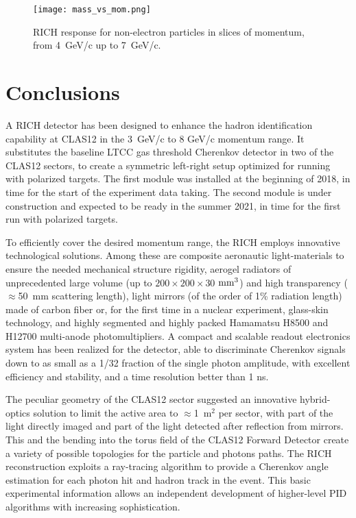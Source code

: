 \documentclass[5p,times,twocolumn]{elsarticle}
\begin{document}
\begin{figure}[t]
\begin{center}
\texttt{[image: mass\_vs\_mom.png]}
\end{center}
\caption{RICH response for non-electron particles in slices of momentum, from 4~GeV/c up to 7~GeV/c.}
\label{Fig:CHhad2}
\end{figure}

\section{Conclusions}

A RICH detector has been designed to enhance the hadron identification capability 
at CLAS12 in the 3~GeV/c to 8 GeV/c momentum range. It substitutes the baseline LTCC gas threshold Cherenkov detector 
in two of the CLAS12 sectors, to create a symmetric left-right setup 
optimized for running with polarized targets. The first module was
installed at the beginning of 2018, in time for the start of the experiment data 
taking. The second module is under construction and expected to be ready in 
the summer 2021, in time for the first run with polarized targets.

To efficiently cover the desired momentum range, the RICH employs 
innovative technological solutions. Among these are composite 
aeronautic light-materials to ensure the needed mechanical structure rigidity, 
aerogel radiators of unprecedented large volume (up to $200 \times 200 \times 30$ $\rm mm^3$) 
and high transparency ($\approx$50~mm scattering length), light mirrors
(of the order of 1\% radiation length) made of carbon fiber or, for
the first time in a nuclear experiment, glass-skin technology, and
highly segmented and highly packed Hamamatsu H8500 and H12700 multi-anode photomultipliers.
A compact and scalable readout electronics system has been realized for 
the detector, able to discriminate Cherenkov signals down to as small as a 1/32 fraction
of the single photon amplitude, with excellent efficiency and stability,
and a time resolution better than 1 ns.

The peculiar geometry of the CLAS12 sector suggested an innovative 
hybrid-optics solution to limit the active area to $\approx$1~m$^2$ per sector, with part of the light directly
imaged and part of the light detected after reflection from mirrors. This and the bending into
the torus field of the CLAS12 Forward Detector create a variety of
possible topologies for the particle and photons paths. 
The RICH reconstruction exploits a ray-tracing algorithm to provide a
Cherenkov angle estimation for each photon hit and hadron track in 
the event. This basic experimental information allows an independent 
development of higher-level PID algorithms with increasing sophistication.
\end{document}
